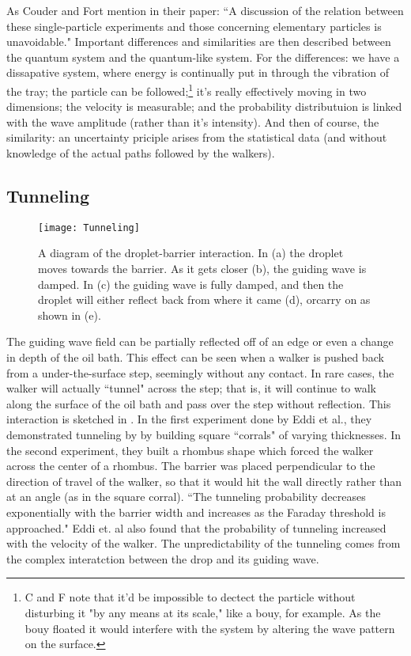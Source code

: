 As Couder and Fort mention in their paper: ``A discussion of the relation between these single-particle experiments and those concerning elementary particles is unavoidable." Important differences and similarities are then described between the quantum system and the quantum-like system. For the differences: we have a dissapative system, where energy is continually put in through the vibration of the tray; the particle can be followed;\footnote{C and F note that it'd be impossible to dectect the particle without disturbing it "by any means at its scale," like a bouy, for example. As the bouy floated it would interfere with the system by altering the wave pattern on the surface.} it's really effectively moving in two dimensions; the velocity is measurable; and the probability distributuion is linked with the wave amplitude (rather than it's intensity). And then of course, the similarity: an uncertainty priciple arises from the statistical data (and without knowledge of the actual paths followed by the walkers). %



\subsection{Tunneling}

\begin{figure}[h!]
 \centering
	    \texttt{[image: Tunneling]}
	     \caption{A diagram of the droplet-barrier interaction. In (a) the droplet moves towards the barrier. As it gets closer (b), the guiding wave is damped. In (c) the guiding wave is fully damped, and then the droplet will either reflect back from where it came (d), orcarry on as shown in (e).}
	 \label{tuncartoon}
	\end{figure}
	       The guiding wave field can be partially reflected off of an edge or even a change in depth of the oil bath. This effect can be seen when a walker is pushed back from a under-the-surface step, seemingly without any contact. In rare cases, the walker will actually ``tunnel" across the step; that is, it will continue to walk along the surface of the oil bath and pass over the step without reflection. This interaction is sketched in . In the first experiment done by Eddi et al., they demonstrated tunneling by by building square ``corrals" of varying thicknesses\cite{tunneling}. In the second experiment, they built a rhombus shape which forced the walker across the center of a rhombus. The barrier was placed perpendicular to the direction of travel of the walker, so that it would hit the wall directly rather than at an angle (as in the square corral). ``The tunneling probability decreases exponentially with the barrier width and increases as the Faraday threshold is approached." Eddi et. al also found that the probability of tunneling increased with the velocity of the walker.  The unpredictability of the tunneling comes from the complex interatction between the drop and its guiding wave. 


